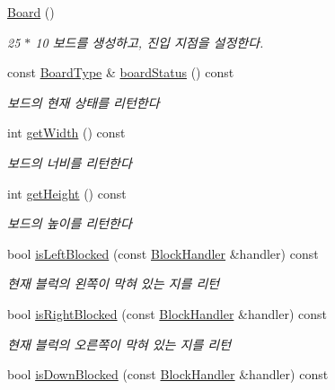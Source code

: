 \begin{DoxyCompactItemize}
\item 
\mbox{\hyperlink{class_board_a9ee491d4fea680cf69b033374a9fdfcb}{Board}} ()
\begin{DoxyCompactList}\small\item\em 25 $\ast$ 10 보드를 생성하고, 진입 지점을 설정한다. \end{DoxyCompactList}\item 
const \mbox{\hyperlink{class_board_a84bf794bc185e31e333b78bb003c4bc3}{Board\+Type}} \& \mbox{\hyperlink{class_board_ac96b4da16e8dc266b39772f2da3fd7e2}{board\+Status}} () const
\begin{DoxyCompactList}\small\item\em 보드의 현재 상태를 리턴한다 \end{DoxyCompactList}\item 
int \mbox{\hyperlink{class_board_a31bdad2985e3b4857a383dd2da8e8e27}{get\+Width}} () const
\begin{DoxyCompactList}\small\item\em 보드의 너비를 리턴한다 \end{DoxyCompactList}\item 
int \mbox{\hyperlink{class_board_a888725ae3b1177a60a8f77299c1c939a}{get\+Height}} () const
\begin{DoxyCompactList}\small\item\em 보드의 높이를 리턴한다 \end{DoxyCompactList}\item 
bool \mbox{\hyperlink{class_board_a5545704e21b5f7447eb9ffe014954cb3}{is\+Left\+Blocked}} (const \mbox{\hyperlink{class_block_handler}{Block\+Handler}} \&handler) const
\begin{DoxyCompactList}\small\item\em 현재 블럭의 왼쪽이 막혀 있는 지를 리턴 \end{DoxyCompactList}\item 
bool \mbox{\hyperlink{class_board_ad38cdb8757f58a32b5747e2b7e0be277}{is\+Right\+Blocked}} (const \mbox{\hyperlink{class_block_handler}{Block\+Handler}} \&handler) const
\begin{DoxyCompactList}\small\item\em 현재 블럭의 오른쪽이 막혀 있는 지를 리턴 \end{DoxyCompactList}\item 
bool \mbox{\hyperlink{class_board_ad617ae22e46d1a62ed33592b20e00b44}{is\+Down\+Blocked}} (const \mbox{\hyperlink{class_block_handler}{Block\+Handler}} \&handler) const

\end{DoxyCompactItemize}
